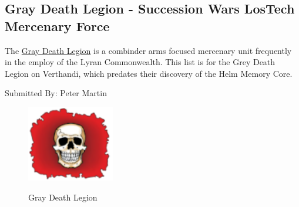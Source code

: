 \subsection{Gray Death Legion - Succession Wars LosTech Mercenary Force}

The \href{https://www.sarna.net/wiki/Gray_Death_Legion}{Gray Death Legion} is a combinder arms focused mercenary unit frequently in the employ of the Lyran Commonwealth.
This list is for the Grey Death Legion on Verthandi, which predates their discovery of the Helm Memory Core.

Submitted By: Peter Martin

\begin{figure}[!h]
  \centering
  \includegraphics[alt='Gray Death Legion Logo', width=1.5in, height=1.306in]{img/Gray-Death-Legion.png}
  \caption*{Gray Death Legion}
\end{figure}


